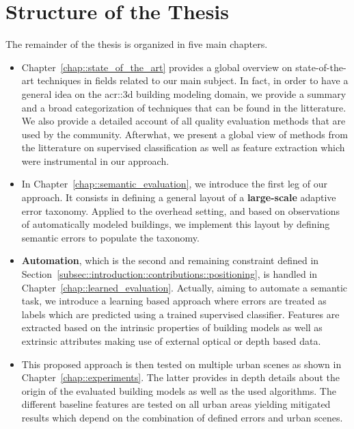 \section{Structure of the Thesis}
    \label{sec::introduction::structure_of_thesis}
    The remainder of the thesis is organized in five main chapters.\\
    \begin{itemize}[label=\(\blacktriangleright\)]
        \item Chapter~\ref{chap::state_of_the_art} provides a global overview on state-of-the-art techniques in fields related to our main subject.
                In fact, in order to have a general idea on the \gls{acr::3d} building modeling domain, we provide a summary and a broad categorization of techniques that can be found in the litterature.
                We also provide a detailed account of all quality evaluation methods that are used by the community.
                Afterwhat, we present a global view of methods from the litterature on supervised classification as well as feature extraction which were instrumental in our approach.
        \item In Chapter~\ref{chap::semantic_evaluation}, we introduce the first leg of our approach.
                It consists in defining a general layout of a \textbf{large-scale} adaptive error taxonomy.
                Applied to the overhead setting, and based on observations of automatically modeled buildings, we implement this layout by defining semantic errors to populate the taxonomy.
        \item \textbf{Automation}, which is the second and remaining constraint defined in Section~\ref{subsec::introduction::contributions::positioning}, is handled in Chapter~\ref{chap::learned_evaluation}.
                Actually, aiming to automate a semantic task, we introduce a learning based approach where errors are treated as labels which are predicted using a trained supervised classifier.
                Features are extracted based on the intrinsic properties of building models as well as extrinsic attributes making use of external optical or depth based data.
        \item This proposed approach is then tested on multiple urban scenes as shown in Chapter~\ref{chap::experiments}.
                The latter provides in depth details about the origin of the evaluated building models as well as the used algorithms.
                The different baseline features are tested on all urban areas yielding mitigated results which depend on the combination of defined errors and urban scenes.

\end{itemize}
